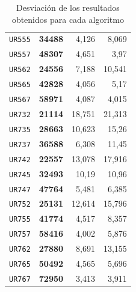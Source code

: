 \documentclass[11pt]{article}
\begin{document}
\begin{table}[htbp]
\begin{center}
\begin{tabular}{|r|r|r|r|}
   \texttt{UR555} & \textbf{34488} &  4,126 & 8,069 \\ 
   \texttt{UR557} & \textbf{48307} &  4,651 & 3,97 \\ 
   \texttt{UR562} & \textbf{24556} &  7,188 & 10,541 \\ 
   \texttt{UR565} & \textbf{42828} &  4,056 & 5,17 \\ 
   \texttt{UR567} & \textbf{58971} &  4,087 & 4,015 \\ 
   \texttt{UR732} & \textbf{21114} & 18,751 & 21,313 \\ 
   \texttt{UR735} & \textbf{28663} & 10,623 & 15,26 \\ 
   \texttt{UR737} & \textbf{36588} &  6,308 & 11,45 \\ 
   \texttt{UR742} & \textbf{22557} & 13,078 & 17,916 \\ 
   \texttt{UR745} & \textbf{32493} &  10,19 & 10,96 \\ 
   \texttt{UR747} & \textbf{47764} &  5,481 & 6,385 \\ 
   \texttt{UR752} & \textbf{25131} & 12,614 & 15,796 \\ 
   \texttt{UR755} & \textbf{41774} &  4,517 & 8,357 \\ 
   \texttt{UR757} & \textbf{58416} &  4,002 & 5,876 \\ 
   \texttt{UR762} & \textbf{27880} &  8,691 & 13,155 \\ 
   \texttt{UR765} & \textbf{50492} &  4,565 & 5,696 \\ 
   \texttt{UR767} & \textbf{72950} &  3,413 & 3,911 \\ \hline
   \end{tabular}
   \end{center}
   \caption{Desviación de los resultados obtenidos para cada algoritmo}
   \label{tablaDesv}
   \end{table}
\end{document}
